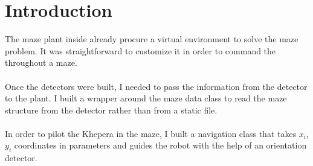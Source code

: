 \section{Introduction}

The maze plant inside \clsquare{} already procure a virtual environment to 
solve the maze problem. It was straightforward to customize it in order 
to command the \khepera{} throughout a maze. 
\\
\\
Once the detectors were built, I needed to pass the information from 
the detector to the plant. I built a wrapper around the maze data class
to read the maze structure from the detector rather than from a static 
file. 
\\
\\
In order to pilot the Khepera in the maze, I built a navigation class 
that takes $x_i$, $y_i$ coordinates in parameters and guides the 
robot with the 
help of an orientation detector.
